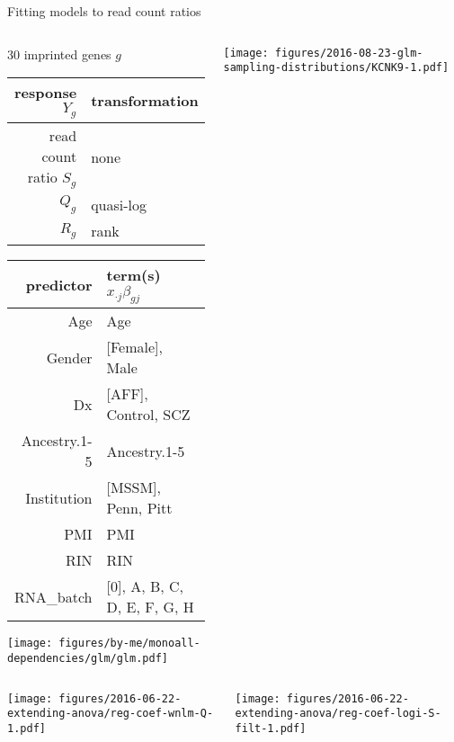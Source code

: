 \documentclass{beamer}
\newcommand{\platefigscale}[0]{0.7}
\begin{document}
\begin{frame}{Fitting models to read count ratios}
\begin{columns}[t]
\begin{column}{0.45\textwidth}
\footnotesize 30 imprinted genes \(g\)
\vfill
\tiny
\begin{tabular}{|r|l|}
\hline
response \(Y_g\) & transformation \\
\hline
read count ratio \(S_g\) & none \\
\(Q_g\) & quasi-log \\
\(R_g\) & rank \\
\hline
\end{tabular}
\begin{tabular}{|r|l|}
\hline
predictor & term(s) \(x_{\cdot j} \beta_{gj}\)\\
\hline
Age & Age\\
Gender & [Female], Male\\
Dx & [AFF], Control, SCZ\\
Ancestry.1-5 & Ancestry.1-5\\
Institution & [MSSM], Penn, Pitt\\
PMI & PMI\\
RIN & RIN\\
RNA\_batch & [0], A, B, C, D, E, F, G, H\\
\hline
\end{tabular}

\texttt{[image: figures/by-me/monoall-dependencies/glm/glm.pdf]}

\end{column}
\begin{column}{0.60\textwidth}

\texttt{[image: figures/2016-08-23-glm-sampling-distributions/KCNK9-1.pdf]}
\end{column}
\end{columns}
\end{frame}

\begin{frame}[plain]
\begin{columns}[t]
\begin{column}{0.5\textwidth}

\texttt{[image: figures/2016-06-22-extending-anova/reg-coef-wnlm-Q-1.pdf]}
\end{column}

\begin{column}{0.5\textwidth}

\texttt{[image: figures/2016-06-22-extending-anova/reg-coef-logi-S-filt-1.pdf]}
\end{column}
\end{columns}
\end{frame}
\end{document}

